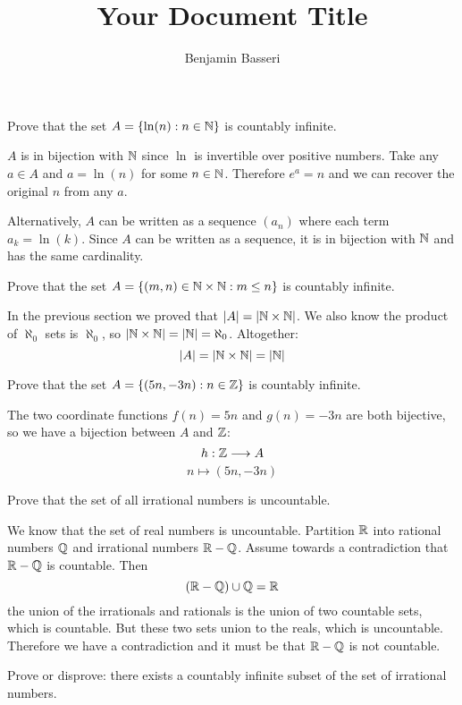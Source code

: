 \documentclass{article}
\title{Your Document Title}
\author{Benjamin Basseri}
\begin{document}
\maketitle

\begin{problem}
Prove that the set $A = \{\ln(n): n \in \mathbb{N}\}$ is countably infinite.
\end{problem}

$A$ is in bijection with $\mathbb{N}$ since $\ln$ is invertible over positive numbers. Take any $a \in A$ and $a = \ln(n)$ for some $n \in \mathbb{N}$. Therefore $e^a = n$ and we can recover the original $n$ from any $a$.

Alternatively, $A$ can be written as a sequence $(a_n)$ where each term $a_k = \ln(k)$. Since $A$ can be written as a sequence, it is in bijection with $\mathbb{N}$ and has the same cardinality.

\begin{problem}
Prove that the set $A = \{(m, n) \in \mathbb{N} \times \mathbb{N}: m \leq n\}$ is countably infinite.
\end{problem}

In the previous section we proved that $|A| = |\mathbb{N} \times \mathbb{N}|$. We also know the product of $\aleph_0$ sets is $\aleph_0$, so $|\mathbb{N} \times \mathbb{N}| = |\mathbb{N}| = \aleph_0$. Altogether:
$$|A| = |\mathbb{N} \times \mathbb{N}| = |\mathbb{N}|$$

\begin{problem}
Prove that the set $A = \{(5n, -3n): n \in \mathbb{Z}\}$ is countably infinite.
\end{problem}

The two coordinate functions $f(n) = 5n$ and $g(n) = -3n$ are both bijective, so we have a bijection between $A$ and $\mathbb{Z}$:
$$h: \mathbb{Z} \longrightarrow A$$
$$n \longmapsto (5n, -3n)$$

\begin{problem}
Prove that the set of all irrational numbers is uncountable.
\end{problem}

We know that the set of real numbers is uncountable. Partition $\mathbb{R}$ into rational numbers $\mathbb{Q}$ and irrational numbers $\mathbb{R} - \mathbb{Q}$. Assume towards a contradiction that $\mathbb{R} - \mathbb{Q}$ is countable. Then
$$(\mathbb{R} - \mathbb{Q}) \cup \mathbb{Q} = \mathbb{R}$$
the union of the irrationals and rationals is the union of two countable sets, which is countable. But these two sets union to the reals, which is uncountable. Therefore we have a contradiction and it must be that $\mathbb{R} - \mathbb{Q}$ is not countable.

\begin{problem}
Prove or disprove: there exists a countably infinite subset of the set of irrational numbers.
\end{problem}
\end{document}
